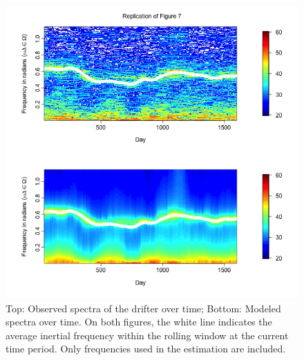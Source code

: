 \documentclass{stat572Style}
\begin{document}
   \begin{figure}[h!]
  \centering
    \includegraphics[width=1\textwidth]{ReplicatedFigures/fig7.png}
        \caption{Top: Observed spectra of the drifter over time; Bottom: Modeled spectra over time. On both figures, the white line indicates the average inertial frequency within the rolling window at the current time period.  Only frequencies used in the estimation are included.  }
        	\label{fig:timeVarying}
\end{figure}
\end{document}

